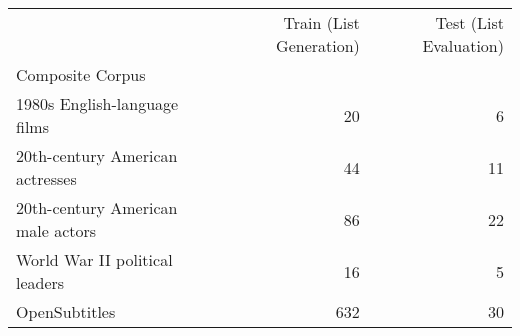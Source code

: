 \begin{tabular}{lrr}
\toprule
 & Train (List Generation) & Test (List Evaluation) \\
Composite Corpus &  &  \\
\midrule
1980s English-language films & 20 & 6 \\
20th-century American actresses & 44 & 11 \\
20th-century American male actors & 86 & 22 \\
World War II political leaders & 16 & 5 \\
OpenSubtitles & 632 & 30 \\
\bottomrule
\end{tabular}

